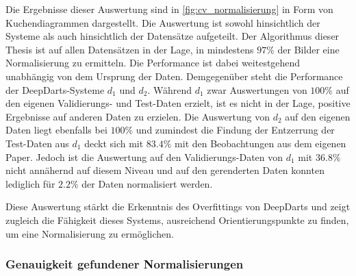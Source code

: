 Die Ergebnisse dieser Auswertung sind in \autoref{fig:cv_normalisierung} in Form von Kuchendiagrammen dargestellt. Die Auswertung ist sowohl hinsichtlich der Systeme als auch hinsichtlich der Datensätze aufgeteilt. Der Algorithmus dieser Thesis ist auf allen Datensätzen in der Lage, in mindestens $97\%$ der Bilder eine Normalisierung zu ermitteln. Die Performance ist dabei weitestgehend unabhängig von dem Ursprung der Daten. Demgegenüber steht die Performance der DeepDarts-Systeme $d_1$ und $d_2$. Während $d_1$ zwar Auswertungen von $100\%$ auf den eigenen Validierungs- und Test-Daten erzielt, ist es nicht in der Lage, positive Ergebnisse auf anderen Daten zu erzielen. Die Auswertung von $d_2$ auf den eigenen Daten liegt ebenfalls bei $100\%$ und zumindest die Findung der Entzerrung der Test-Daten aus $d_1$ deckt sich mit $83.4\%$ mit den Beobachtungen aus dem eigenen Paper. Jedoch ist die Auswertung auf den Validierungs-Daten von $d_1$ mit $36.8\%$ nicht annähernd auf diesem Niveau und auf den gerenderten Daten konnten lediglich für $2.2\%$ der Daten normalisiert werden.

Diese Auswertung stärkt die Erkenntnis des Overfittings von DeepDarts und zeigt zugleich die Fähigkeit dieses Systems, ausreichend Orientierungspunkte zu finden, um eine Normalisierung zu ermöglichen.

\subsubsection{Genauigkeit gefundener Normalisierungen} %

\Similarities

